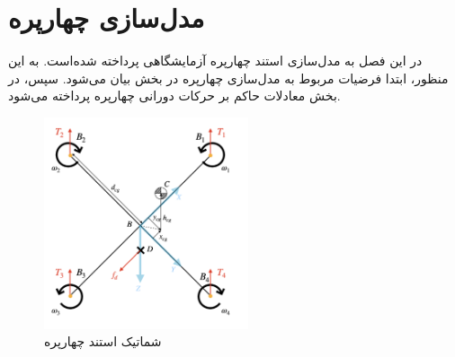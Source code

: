 \documentclass{CCI2020}
\begin{document}
\section{مدل‌سازی چهارپره}
در این فصل به مدل‌سازی استند چهارپره آزمایشگاهی پرداخته شده‌است. به این منظور، ابتدا فرضیات مربوط به مدل‌سازی چهارپره در بخش بیان می‌شود. سپس، در بخش معادلات حاکم بر حرکات دورانی چهارپره پرداخته می‌شود.

\begin{figure}[!h]
	\includegraphics[width=6cm]{images/StandAssumations.png}
	\centering
	\caption{شماتیک استند چهارپره}
	\label{QuadAssum}
\end{figure}
\end{document}

